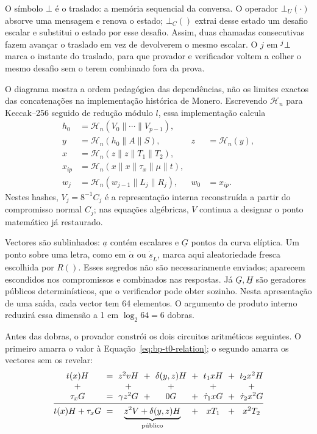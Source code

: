 O símbolo \(\bot\) é o traslado: a memória sequencial da conversa. O operador
\(\bot_U(\cdot)\) absorve uma mensagem e renova o estado; \(\bot_C()\) extrai
desse estado um desafio escalar e substitui o estado por esse desafio. Assim,
duas chamadas consecutivas fazem avançar o traslado em vez de devolverem o
mesmo escalar. O \(j\) em \(^{j}_{\ }\bot\) marca o instante do traslado,
para que provador e verificador voltem a colher o mesmo desafio sem o terem
combinado fora da prova.

O diagrama mostra a ordem pedagógica das dependências, não os limites exactos
das concatenações na implementação histórica de Monero. Escrevendo
\(\mathcal H_n\) para Keccak--256 seguido de redução módulo \(l\), essa
implementação calcula
\begin{align*}
 h_0&=\mathcal H_n(V_0\mathbin\|\cdots\mathbin\|V_{p-1}),\\
 y&=\mathcal H_n(h_0\mathbin\|A\mathbin\|S),&
 z&=\mathcal H_n(y),\\
 x&=\mathcal H_n(z\mathbin\|z\mathbin\|T_1\mathbin\|T_2),\\
 x_{ip}&=\mathcal H_n(x\mathbin\|x\mathbin\|\tau_x\mathbin\|\mu
                     \mathbin\|t),\\
 w_j&=\mathcal H_n(w_{j-1}\mathbin\|L_j\mathbin\|R_j),&w_0&=x_{ip}.
\end{align*}
Nestes hashes, \(V_j=8^{-1}C_j\) é a representação interna reconstruída a
partir do compromisso normal \(C_j\); nas equações algébricas, \(V\) continua a
designar o ponto matemático já restaurado.

Vectores são sublinhados: \(\underline a\) contém escalares e
\(\underline G\) pontos da curva elíptica. Um ponto sobre uma letra, como em
\(\dot\alpha\) ou \(\underline{\dot s}_L\), marca aqui aleatoriedade fresca
escolhida por \(R()\). Esses segredos não são necessariamente enviados; aparecem
escondidos nos compromissos e combinados nas respostas. Já
\(\underline G,\underline H\) são geradores públicos determinísticos, que o
verificador pode obter sozinho. Nesta apresentação de uma saída, cada vector
tem 64 elementos. O argumento de produto interno reduzirá essa dimensão a 1 em
\(\log_2 64=6\) dobras.

Antes das dobras, o provador constrói os dois circuitos aritméticos seguintes.
O primeiro amarra o valor à Equação~\eqref{eq:bp-t0-relation}; o segundo amarra
os vectores sem os revelar:
\[
\begingroup
\setlength{\arraycolsep}{3pt}
\begin{array}{@{}c c c c c c c c c@{}}
 t(x)H &=& z^2vH &+& \delta(y,z)H &+& t_1xH &+& t_2x^2H\\
 +     && +      && +             && +       && +\\
 \tau_xG &=& \gamma z^2 G &+& 0G &+& \dot{\tau}_1xG &+& \dot{\tau}_2x^2G\\
 \midrule
 t(x)H+\tau_xG &=& \multicolumn{3}{c}{\underbrace{z^2V+\delta(y,z)H}_{\text{público}}}
 &+& xT_1 &+& x^2T_2
\end{array}
\endgroup
\]

